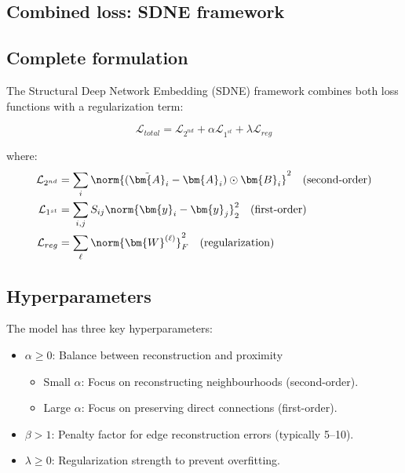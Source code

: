 \begin{notechapter}
\section{Combined loss: SDNE framework}

\subsection{Complete formulation}

The Structural Deep Network Embedding (SDNE) framework combines both loss functions with a regularization term:

\begin{equation}
\mathcal{L}_{total} = \mathcal{L}_{2^{nd}} + \alpha \mathcal{L}_{1^{st}} + \lambda \mathcal{L}_{reg}
\label{graph-autoencoders:eq:total_loss}
\end{equation}

where:
\begin{align}
\mathcal{L}_{2^{nd}} &= \sum_{i} \norm{(\tilde{\bm{A}}_i - \bm{A}_i) \hadamard \bm{B}_i}^2 \quad \text{(second-order)} \\
\mathcal{L}_{1^{st}} &= \sum_{i,j} S_{ij} \norm{\bm{y}_i - \bm{y}_j}^2_2 \quad \text{(first-order)} \\
\mathcal{L}_{reg} &= \sum_{\ell} \norm{\bm{W}^{(\ell)}}^2_F \quad \text{(regularization)}
\end{align}

\subsection{Hyperparameters}

The model has three key hyperparameters:

\begin{itemize}
    \item $\alpha \geq 0$: Balance between reconstruction and proximity
    \begin{itemize}
        \item Small $\alpha$: Focus on reconstructing neighbourhoods (second-order).
        \item Large $\alpha$: Focus on preserving direct connections (first-order).
    \end{itemize}
    \item $\beta > 1$: Penalty factor for edge reconstruction errors (typically 5--10).
    \item $\lambda \geq 0$: Regularization strength to prevent overfitting.
\end{itemize}


\end{notechapter}
